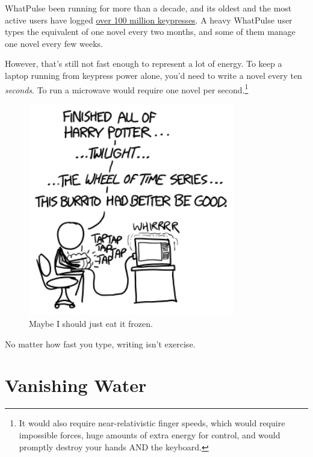 {{WhatPulse been running for more than a decade, and its oldest and the most active users have logged \href{http://www.whatpulse.org/stats/input/?page=1}{over 100 million keypresses}. A heavy WhatPulse user types the equivalent of one novel every two months, and some of them manage one novel every few weeks.}

{However, that's still not fast enough to represent a lot of energy. To keep a laptop running from keypress power alone, you'd need to write a novel every ten \emph{seconds}. To run a microwave would require one novel per second.{\footnote{It would also require near-relativistic finger speeds, which would require impossible forces, huge amounts of extra energy for control, and would promptly destroy your hands AND the keyboard.} } }

\begin{figure}[!htbp]
\centering
\includegraphics[scale=0.5, max width=0.8\textwidth]{imgs/a/102/fast.png}
\caption{Maybe I should just eat it frozen.}
\end{figure}

{No matter how fast you type, writing isn't exercise.}

{
\chapter{Vanishing Water}
}

}
